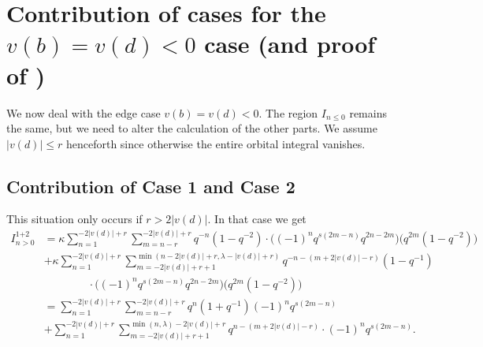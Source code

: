 \section{Contribution of cases for the $v(b) = v(d) < 0$ case (and proof of )}
We now deal with the edge case $v(b) = v(d) < 0$.
The region $I_{n \le 0}$ remains the same, but we need to alter the calculation of the other parts.
We assume $|v(d)| \le r$ henceforth since otherwise the entire orbital integral vanishes.

\subsection{Contribution of Case 1 and Case 2}
This situation only occurs if $r > 2|v(d)|$.
In that case we get
\begin{align*}
  I_{n > 0}^{\text{1+2}}
  &= \kappa \sum_{n=1}^{-2|v(d)|+r}
    \sum_{m=n-r}^{-2|v(d)|+r}
    q^{-n} \left( 1 - q^{-2} \right)
    \cdot \Big( (-1)^n q^{s(2m-n)} q^{2n-2m} \Big) \Big( q^{2m}(1-q^{-2}) \Big) \\
  &+ \kappa \sum_{n=1}^{-2|v(d)|+r}
    \sum_{m=-2|v(d)|+r+1}^{\min\left(n-2|v(d)|+r, \lambda-|v(d)|+r\right)}
    q^{-n - (m+2|v(d)|-r)} \left( 1 - q^{-1} \right) \\
  &\qquad\qquad\cdot \Big( (-1)^n q^{s(2m-n)} q^{2n-2m} \Big) \Big( q^{2m}(1-q^{-2}) \Big) \\
  &= \sum_{n=1}^{-2|v(d)|+r} \sum_{m=n-r}^{-2|v(d)|+r}
    q^{n} \left( 1 + q^{-1} \right) (-1)^n q^{s(2m-n)} \\
  &+ \sum_{n=1}^{-2|v(d)|+r}
    \sum_{m=-2|v(d)|+r+1}^{\min\left(n,\lambda\right) - 2|v(d)| + r}
    q^{n - (m+2|v(d)|-r)} \cdot (-1)^n q^{s(2m-n)}.
\end{align*}

